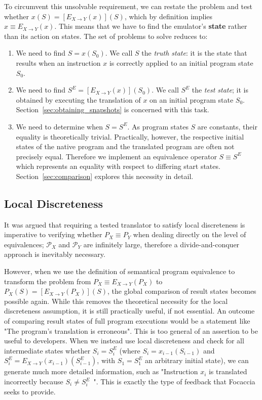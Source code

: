 To circumvent this unsolvable requirement, we can restate the problem and test whether $x(S) = [E_{X \rightarrow
Y}(x)](S)$, which by definition implies $x \equiv E_{X \rightarrow Y}(x)$. This means that we have to find the
emulator's \textbf{state} rather than its action on states. The set of problems to solve reduces to:

\begin{enumerate}
    \item We need to find $S = x(S_0)$. We call $S$ the \textit{truth state}: it is the state that results when an
        instruction $x$ is correctly applied to an initial program state $S_0$.
    \item We need to find $S^E = [E_{X \rightarrow Y}(x)](S_0)$. We call $S^E$ the \textit{test state}; it is obtained
        by executing the translation of $x$ on an initial program state $S_0$. Section~\ref{sec:obtaining_snapshots} is
        concerned with this task.
    \item We need to determine when $S = S^E$. As program states $S$ are constants, their equality is theoretically
        trivial. Practically, however, the respective initial states of the native program and the translated program
        are often not precisely equal. Therefore we implement an equivalence operator $S \equiv S^E$ which represents an
        equality with respect to differing start states. Section~\ref{sec:comparison} explores this necessity in detail.
\end{enumerate}

\subsection{Local Discreteness}\label{sec:local_discreteness}

It was argued that requiring a tested translator to satisfy local discreteness is imperative to verifying whether $P_X
\equiv P_Y$ when dealing directly on the level of equivalences; $\mathcal{P}_X$ and $\mathcal{P}_Y$ are infinitely
large, therefore a divide-and-conquer approach is inevitably necessary.

However, when we use the definition of semantical program equivalence to transform the problem from $P_X \equiv E_{X
\rightarrow Y}(P_X)$ to $P_X(S) = [E_{X \rightarrow Y}(P_X)](S)$, the global comparison of result states becomes
possible again.  While this removes the theoretical necessity for the local discreteness assumption, it is still
practically useful, if not essential. An outcome of comparing result states of full program executions would be a
statement like "The program's translation is erroneous". This is too general of an assertion to be useful to
developers. When we instead use local discreteness and check for all intermediate states whether $S_i = S^E_i$ (where
$S_i = x_{i-1}(S_{i-1})$ and $S^E_i = E_{X \rightarrow Y}(x_{i-1})(S^E_{i-1})$, with $S_1 = S^E_1$ an arbitrary initial
state), we can generate much more detailed information, such as "Instruction $x_i$ is translated incorrectly because
$S_i \neq S^E_i$~". This is exactly the type of feedback that Focaccia seeks to provide.

